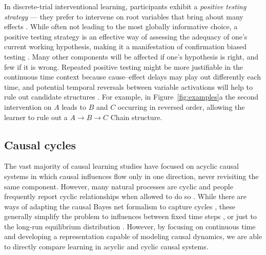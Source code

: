 \documentclass[10pt,letterpaper]{article}
\newcommand{\ttodo}[2][]
{\todo[caption={#2}, size=\small, #1, color = orange, inline]{\renewcommand{\baselinestretch}{1}\selectfont \textbf{TG}: #2}~}
\begin{document}
In discrete-trial interventional learning, participants exhibit a \emph{positive testing strategy} --- they prefer to intervene on root variables that bring about many effects \citep{coenen2015strategies}.  While often not leading to the most globally informative choice, a positive testing strategy is an effective way of assessing the adequacy of one's current working hypothesis, making it a manifestation of confirmation biased testing \citep{nickerson1998confirmation}.  Many other components will be affected if one's hypothesis is right, and few if it is wrong.  Repeated positive testing might be more justifiable in the continuous time context because cause--effect delays may play out differently each time, and potential temporal reversals between variable activations will help to rule out candidate structures \citep{bramley2014order}. 
For example, in Figure~\ref{fig:examples}a the second intervention on $A$ leads to $B$ and $C$ occurring in reversed order, allowing the learner to rule out a $A\rightarrow B\rightarrow C$ Chain structure.

\subsection{Causal cycles}

The vast majority of causal learning studies have focused on acyclic causal systems in which causal influences flow only in one direction, never revisiting the same component.  However, many natural processes are cyclic and people frequently report cyclic relationships when allowed to do so \citep[e.g.][]{sloman1998feature}.  While there are ways of adapting the causal Bayes net formalism to capture cycles \citep{rehder2016cycles}, these generally simplify the problem to influences between fixed time steps \citep[e.g.][]{rottman2012causal}, or just to the long-run equilibrium distribution \citep[e.g.][]{lauritzen2002chain}.  However, by focusing on continuous time and developing a representation capable of modeling causal dynamics, we are able to directly compare learning in acyclic and cyclic causal systems.%
\end{document}
